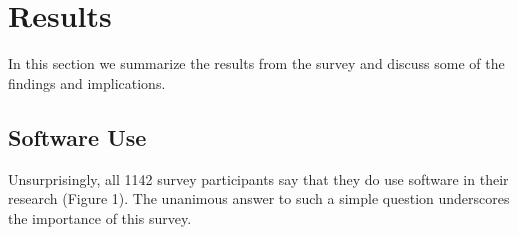 \section{Results}
\label{sec:res}

In this section we summarize the results from the survey and discuss some of the findings and implications.

\subsection{Software Use}
Unsurprisingly, all 1142 survey participants say that they do use software in their research (Figure 1). The unanimous answer to such a simple question underscores the importance of this survey.